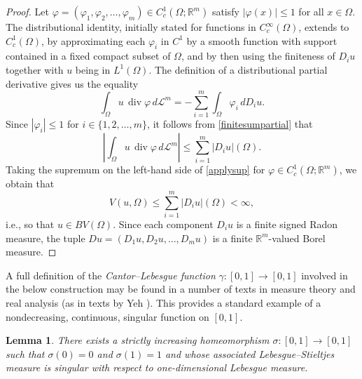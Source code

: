 \documentclass[10pt,a4paper]{amsart}
\newtheorem{lemma}{Lemma}%
\begin{document}
\begin{proof}
Let $\varphi = (\varphi_1,\varphi_2, \ldots, \varphi_m)\in C_c^1(\Omega;\mathbb R^m)$
satisfy \(|\varphi(x)|\leq 1\) for all \(x\in\Omega\). 
 The distributional identity, initially stated for
 functions in \(C_c^\infty(\Omega)\), extends to \(C_c^1(\Omega)\), by approximating 
 each $\varphi_i$ in $C^1$ by a smooth function with support contained in a
 fixed compact subset of \(\Omega\), and by then using
 the finiteness of $D_i u$ together with $u$ being in $ L^1(\Omega)$. 
 The definition of a distributional partial derivative gives us the equality 
\begin{equation}\label{finitesumpartial}
\int_\Omega u\,\operatorname{div}\varphi\,d\mathcal L^m
=
-\sum_{i=1}^m \int_\Omega \varphi_i\,dD_i u. 
\end{equation} 
 Since \(|\varphi_i|\leq 1\) for $i \in \{ 1, 2, \ldots, m \}$, it follows from \eqref{finitesumpartial} that
\begin{equation}\label{applysup}
\left|
\int_\Omega u\,\operatorname{div}\varphi\,d\mathcal L^m
\right|
\leq
\sum_{i=1}^m |D_i u|(\Omega).
\end{equation}
 Taking the supremum on the left-hand side of \eqref{applysup}
 for $\varphi \in C_c^1(\Omega;\mathbb R^m)$, 
 we obtain that 
$$
V(u,\Omega)\leq \sum_{i=1}^m |D_i u|(\Omega)<\infty, 
$$
 i.e., so that $u \in BV(\Omega)$. Since each component \(D_i u\) is a finite signed
 Radon measure, the tuple $Du = (D_1u, D_2u, \ldots,D_mu)$ is a finite
\(\mathbb R^m\)-valued Borel measure.
\end{proof}

 A full definition of the \emph{Cantor--Lebesgue function} \(\gamma:[0,1]\to[0,1]\)
 involved in the below construction may be found in a number of texts in measure theory and real analysis
 (as in texts by Yeh \cite[pp.\ 76--77]{Yeh2000}
 \cite[pp. 87--88]{Yeh2006}). 
 This provides a standard example of a nondecreasing, continuous, singular function on $[0, 1]$.

\begin{lemma}\label{lemmasigma}%
There exists a strictly increasing homeomorphism $ \sigma:[0,1]\to[0,1]$
 such that 
$\sigma(0)=0$ and $\sigma(1)=1$ and 
 whose associated Lebesgue--Stieltjes measure is singular with respect to
one-dimensional Lebesgue measure.
\end{lemma}
\end{document}
